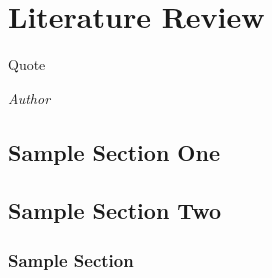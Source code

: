 \documentclass[class=report,11pt,crop=false]{standalone}
\begin{document}
\chapter{Literature Review}
\epigraph{Quote}%
    {\emph{Author}}

\section{Sample Section One}

\blindmathpaper

\section{Sample Section Two}

\blindmathpaper

\subsection{Sample Section}

\blindtext












\ifstandalone

\fi
\end{document}
